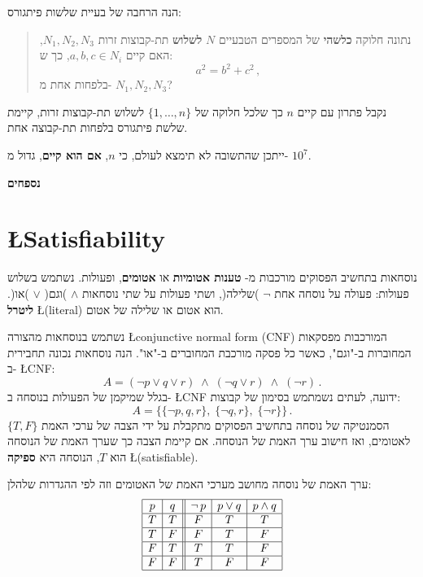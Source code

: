 \documentclass[12pt,a4paper]{article}
\newcommand*{\ngg}{\mathop{\neg}}
\begin{document}
הנה הרחבה של בעיית שלשות פיתגורס:
\begin{quote}
נתונה חלוקה
\textbf{כלשהי}
של המספרים הטבעיים 
$N$
\textbf{לשלוש}
תת-קבוצות זרות
$N_1,N_2,N_3$,
האם קיים
$a,b,c\in N_i$,
כך ש:
\[
a^2=b^2+c^2\,,
\]
בלפחות אחת מ-%
$N_1,N_2,N_3$?
\end{quote}
נקבל פתרון עם קיים 
$n$
כך שלכל חלוקה של 
$\{1,\ldots,n\}$
לשלוש תת-קבוצות זרות, קיימת שלשת פיתגורס בלפחות תת-קבוצה אחת.

ייתכן שהתשובה לא תימצא לעולם, כי
$n$,
\textbf{אם הוא קיים},
גדול מ-%
$10^7$.

\newpage

\textbf{\Large נספחים}

\appendix

\section{\L{Satisfiability} }

נוסחאות בתחשיב הפסוקים מורכבות מ-%
\textbf{טענות אטומיות}
או
\textbf{אטומים},
ופעולות. נשתמש בשלוש פעולות: פעולה על נוסחה אחת
$\ngg$
)שלילה(, ושתי פעולות על שתי נוסחאות
$\wedge$
)וגם(
$\vee$
)או(. 
\textbf{ליטרל}
\L{(literal)}
הוא אטום או שלילה של אטום.

נשתמש בנוסחאות מהצורה
\L{conjunctive normal form (CNF)}
המורכבות מפסקאות המחוברות ב-"וגם", כאשר כל פסקה מורכבת  המחוברים ב-"או". הנה נוסחאות נכונה תחבירית ב-%
\L{CNF}:
\[
A=(\ngg p \vee q \vee r) \;\wedge\; (\ngg q \vee r) \;\wedge\; (\ngg r)\,.
\]
בגלל שמיקמן של הפעולות בנוסחה ב-%
\L{CNF}
ידועה, לעתים נשמתמש בסימון של קבוצות:
\[
A=\{\{\ngg p, q, r\}, \; \{\ngg q, r\}, \; \{\ngg r\}\}\,.
\]
הסמנטיקה של נוסחה בתחשיב הפסוקים מתקבלת על ידי הצבה של ערכי האמת
$\{T,F\}$
לאטומים, ואז חישוב ערך האמת של הנוסחה. אם קיימת הצבה כך שערך האמת של הנוסחה הוא
$T$,
הנוסחה היא 
\textbf{ספיקה}
\L{(satisfiable)}.

ערך האמת של נוסחה מחושב מערכי האמת של האטומים וזה לפי ההגדרות שלהלן:
\[
\begin{array}{|c|c||c|c|c|}
\hline
p & q & \ngg p & p\vee q & p \wedge q\\\hline
T & T & F & T & T\\\hline
T & F & F & T & F\\\hline
F & T & T & T & F\\\hline
F & F & T & F & F\\\hline
\end{array}
\]
\end{document}
